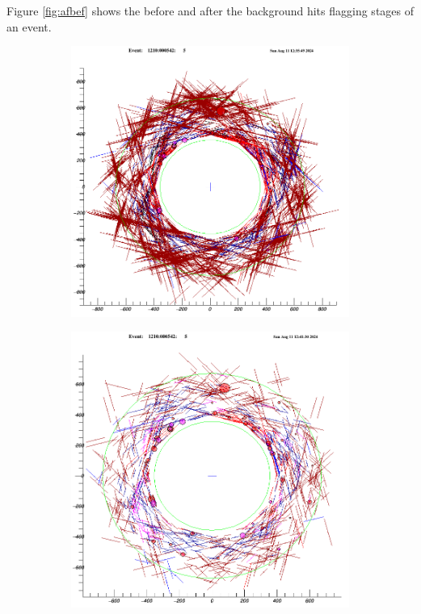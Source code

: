 Figure \ref{fig:afbef} shows the before and after the background hits flagging stages of
an event.  
\begin{figure}[!h]
    \begin{subfigure}[b]{0.4\linewidth}
        \centering
        \includegraphics[scale = 0.3]{figures/png/Screenshot_20240811_123612.png}
        \label{fig:bef}
    \end{subfigure}
    \begin{subfigure}[b]{0.7\linewidth}
        \centering
        \includegraphics[scale = 0.3]{figures/png/Screenshot_20240811_124245.png}

\end{subfigure}
\end{figure}
